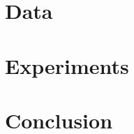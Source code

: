 \documentclass[sigconf]{acmart}
\begin{document}
\section{Data}




\section{Experiments}


\section{Conclusion}


\begin{acks}
\end{acks}




\end{document}
